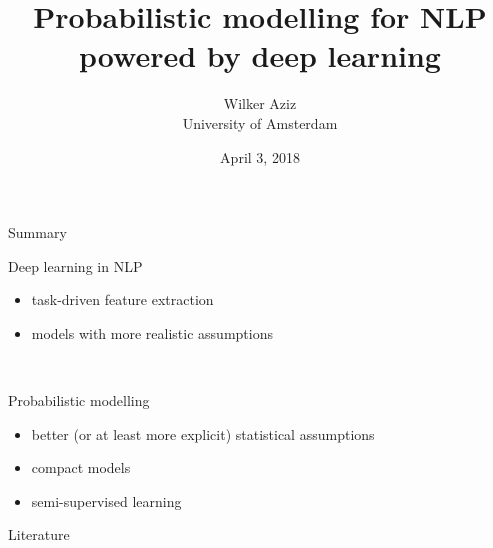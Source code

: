\documentclass[usenames,dvipsnames]{beamer}
\title[DGMs in NLP]{Probabilistic modelling for NLP \\ powered by deep learning}
\author[Wilker Aziz]{Wilker Aziz\\University of Amsterdam}
\date{April 3, 2018}
\begin{document}
\maketitlepage


\setcounter{framenumber}{0}




%

\begin{frame}{Summary}

Deep learning in NLP
\begin{itemize}
	\item task-driven feature extraction
	\item models with more realistic assumptions
\end{itemize}

~

Probabilistic modelling 
\begin{itemize}
	\item better (or at least more explicit) statistical assumptions
	\item compact models
	\item semi-supervised learning
\end{itemize}


\end{frame}

\begin{frame}[allowframebreaks]{Literature}

\small

\end{frame}
\end{document}
